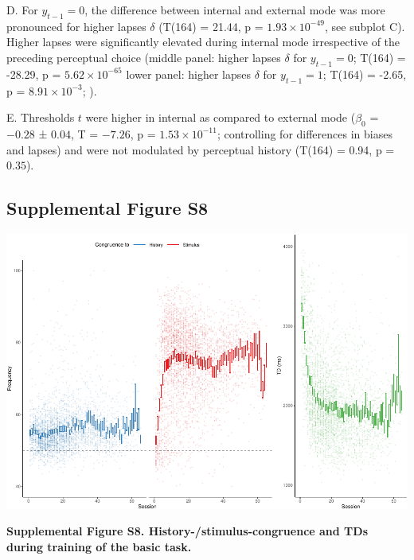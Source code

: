 \documentclass[
]{article}
\begin{document}
D. For \(y_{t-1} = 0\), the difference between internal and external
mode was more pronounced for higher lapses \(\delta\) (T(164) = 21.44, p
= \(\ensuremath{1.93\times 10^{-49}}\), see subplot C). Higher lapses
were significantly elevated during internal mode irrespective of the
preceding perceptual choice (middle panel: higher lapses \(\delta\) for
\(y_{t-1} = 0\); T(164) = -28.29, p =
\(\ensuremath{5.62\times 10^{-65}}\) lower panel: higher lapses
\(\delta\) for \(y_{t-1} = 1\); T(164) = -2.65, p =
\(\ensuremath{8.91\times 10^{-3}}\); ).

E. Thresholds \(t\) were higher in internal as compared to external mode
(\(\beta_0\) = \(-0.28\) ± \(0.04\), T = \(-7.26\), p =
\(\ensuremath{1.53\times 10^{-11}}\); controlling for differences in
biases and lapses) and were not modulated by perceptual history (T(164)
= 0.94, p = \(0.35\)).

\newpage

\hypertarget{supplemental-figure-s8}{%
\subsection{Supplemental Figure S8}\label{supplemental-figure-s8}}

\includegraphics{modes_mouse_rev1b_files/figure-latex/Supplemental_Figure_S8-1.pdf}

\textbf{Supplemental Figure S8. History-/stimulus-congruence and TDs
during training of the basic task.}
\end{document}

